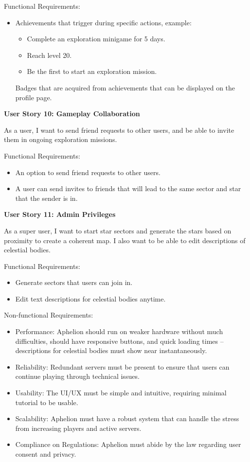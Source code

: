 Functional Requirements:
\begin{itemize}
\item Achievements that trigger during specific actions, example:
\begin{itemize}
\item Complete an exploration minigame for 5 days.
\item Reach level 20.
\item Be the first to start an exploration mission.
\end{itemize}
Badges that are acquired from achievements that can be displayed on the profile page.
\end{itemize}

\textbf{User Story 10: Gameplay Collaboration}

As a user, I want to send friend requests to other users, and be able to invite them in ongoing exploration missions.

Functional Requirements:
\begin{itemize}
\item An option to send friend requests to other users.
\item A user can send invites to friends that will lead to the same sector and star that the sender is in.
\end{itemize}

\textbf{User Story 11: Admin Privileges}

As a super user, I want to start star sectors and generate the stars based on proximity to create a coherent map. I also want to be able to edit descriptions of celestial bodies.

Functional Requirements:
\begin{itemize}
\item Generate sectors that users can join in.
\item Edit text descriptions for celestial bodies anytime.
\end{itemize}

Non-functional Requirements:
\begin{itemize}
\item Performance: Aphelion should run on weaker hardware without much difficulties, should have responsive buttons, and quick loading times – descriptions for celestial bodies must show near instantaneously.
\item Reliability: Redundant servers must be present to ensure that users can continue playing through technical issues.
\item Usability: The UI/UX must be simple and intuitive, requiring minimal tutorial to be usable.
\item Scalability: Aphelion must have a robust system that can handle the stress from increasing players and active servers.
\item Compliance on Regulations: Aphelion must abide by the law regarding user consent and privacy.
\end{itemize}

